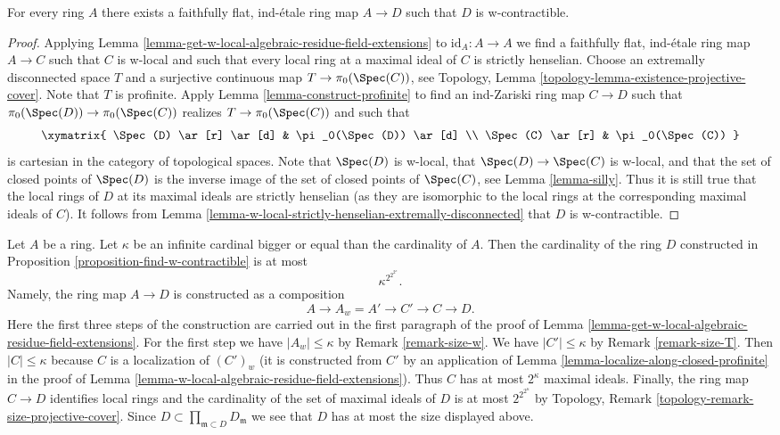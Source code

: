 \begin{proposition}
\label{proposition-find-w-contractible}
For every ring $A$ there exists a faithfully flat, ind-\'etale ring
map $A \to D$ such that $D$ is w-contractible.
\end{proposition}

\begin{proof}
Applying Lemma \ref{lemma-get-w-local-algebraic-residue-field-extensions}
to $\text{id}_A : A \to A$ we find a faithfully flat, ind-\'etale ring map
$A \to C$ such that $C$ is w-local and such that every local ring at a
maximal ideal of $C$ is strictly henselian.
Choose an extremally disconnected space $T$ and a surjective
continuous map $T \to \pi_0(\Spec(C))$, see
Topology, Lemma \ref{topology-lemma-existence-projective-cover}.
Note that $T$ is profinite. Apply Lemma \ref{lemma-construct-profinite}
to find an ind-Zariski ring map $C \to D$ such that
$\pi_0(\Spec(D)) \to \pi_0(\Spec(C))$ realizes $T \to \pi_0(\Spec(C))$
and such that
$$
\xymatrix{
\Spec(D) \ar[r] \ar[d] & \pi_0(\Spec(D)) \ar[d] \\
\Spec(C) \ar[r] & \pi_0(\Spec(C))
}
$$
is cartesian in the category of topological spaces. Note that $\Spec(D)$
is w-local, that $\Spec(D) \to \Spec(C)$ is w-local, and that the
set of closed points of $\Spec(D)$ is the inverse image of the
set of closed points of $\Spec(C)$, see Lemma \ref{lemma-silly}.
Thus it is still true that the local rings of $D$ at its maximal
ideals are strictly henselian (as they are isomorphic to the
local rings at the corresponding maximal ideals of $C$).
It follows from
Lemma \ref{lemma-w-local-strictly-henselian-extremally-disconnected}
that $D$ is w-contractible.
\end{proof}

\begin{remark}
\label{remark-size-w-contractible}
Let $A$ be a ring. Let $\kappa$ be an infinite cardinal bigger or
equal than the cardinality of $A$. Then the cardinality of the
ring $D$ constructed in Proposition \ref{proposition-find-w-contractible}
is at most
$$
\kappa^{2^{2^{2^\kappa}}}.
$$
Namely, the ring map $A \to D$ is
constructed as a composition
$$
A \to A_w = A' \to C' \to C \to D.
$$
Here the first three steps of the construction are carried out
in the first paragraph of the proof of
Lemma \ref{lemma-get-w-local-algebraic-residue-field-extensions}.
For the first step we have $|A_w| \leq \kappa$ by
Remark \ref{remark-size-w}.
We have $|C'| \leq \kappa$ by
Remark \ref{remark-size-T}.
Then $|C| \leq \kappa$ because $C$ is a localization of $(C')_w$
(it is constructed from $C'$ by an application of
Lemma \ref{lemma-localize-along-closed-profinite}
in the proof of Lemma \ref{lemma-w-local-algebraic-residue-field-extensions}).
Thus $C$ has at most $2^\kappa$ maximal ideals.
Finally, the ring map $C \to D$ identifies local rings and the
cardinality of the set of maximal ideals of $D$ is at most
$2^{2^{2^\kappa}}$ by
Topology, Remark \ref{topology-remark-size-projective-cover}.
Since $D \subset \prod_{\mathfrak m \subset D} D_\mathfrak m$ we see
that $D$ has at most the size displayed above.
\end{remark}


